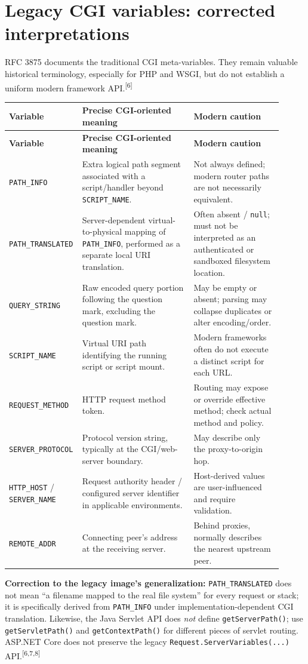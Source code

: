\documentclass[10pt,letterpaper,oneside]{article}
\newcommand{\refs}[1]{\textsuperscript{\color{blue}[#1]}}
\newcommand{\code}[1]{\texttt{#1}}
\begin{document}
\section{Legacy CGI variables: corrected interpretations}
RFC 3875 documents the traditional CGI meta-variables. They remain valuable historical terminology, especially for PHP and WSGI, but do not establish a uniform modern framework API.\refs{6}
\begin{longtable}{P{0.19\linewidth}P{0.40\linewidth}P{0.32\linewidth}}
\toprule
\textbf{Variable} & \textbf{Precise CGI-oriented meaning} & \textbf{Modern caution}\\\midrule\endfirsthead
\toprule\textbf{Variable} & \textbf{Precise CGI-oriented meaning} & \textbf{Modern caution}\\\midrule\endhead
\code{PATH\_INFO} & Extra logical path segment associated with a script/handler beyond \code{SCRIPT\_NAME}. & Not always defined; modern router paths are not necessarily equivalent.\\
\code{PATH\_TRANSLATED} & Server-dependent virtual-to-physical mapping of \code{PATH\_INFO}, performed as a separate local URI translation. & Often absent / \code{null}; must not be interpreted as an authenticated or sandboxed filesystem location.\\
\code{QUERY\_STRING} & Raw encoded query portion following the question mark, excluding the question mark. & May be empty or absent; parsing may collapse duplicates or alter encoding/order.\\
\code{SCRIPT\_NAME} & Virtual URI path identifying the running script or script mount. & Modern frameworks often do not execute a distinct script for each URL.\\
\code{REQUEST\_METHOD} & HTTP request method token. & Routing may expose or override effective method; check actual method and policy.\\
\code{SERVER\_PROTOCOL} & Protocol version string, typically at the CGI/web-server boundary. & May describe only the proxy-to-origin hop.\\
\code{HTTP\_HOST} / \code{SERVER\_NAME} & Request authority header / configured server identifier in applicable environments. & Host-derived values are user-influenced and require validation.\\
\code{REMOTE\_ADDR} & Connecting peer's address at the receiving server. & Behind proxies, normally describes the nearest upstream peer.\\
\bottomrule
\end{longtable}
\begin{riskbox}
\textbf{Correction to the legacy image's generalization:} \code{PATH\_TRANSLATED} does not mean ``a filename mapped to the real file system'' for every request or stack; it is specifically derived from \code{PATH\_INFO} under implementation-dependent CGI translation. Likewise, the Java Servlet API does \emph{not} define \code{getServerPath()}; use \code{getServletPath()} and \code{getContextPath()} for different pieces of servlet routing. ASP.NET Core does not preserve the legacy \code{Request.ServerVariables(...)} API.\refs{6,7,8}
\end{riskbox}
\end{document}
